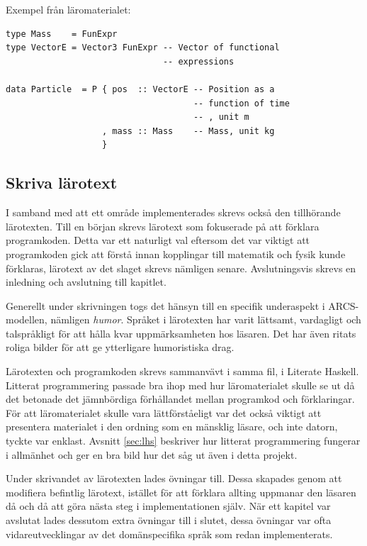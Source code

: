 Exempel från läromaterialet:
\begin{lstlisting}[frame=none, belowskip=-0.5\baselineskip, xleftmargin=0.5in]
type Mass    = FunExpr
type VectorE = Vector3 FunExpr -- Vector of functional
                               -- expressions

data Particle  = P { pos  :: VectorE -- Position as a
                                     -- function of time
                                     -- , unit m
                   , mass :: Mass    -- Mass, unit kg
                   }
\end{lstlisting}

\subsection{Skriva lärotext}

I samband med att ett område implementerades skrevs också den tillhörande
lärotexten. Till en början skrevs lärotext som fokuserade på att förklara
programkoden. Detta var ett naturligt val eftersom det var viktigt att
programkoden gick att förstå innan kopplingar till matematik och fysik kunde
förklaras, lärotext av det slaget skrevs nämligen senare. Avslutningsvis skrevs
en inledning och avslutning till kapitlet.

Generellt under skrivningen togs det hänsyn till en specifik underaspekt i
ARCS-modellen, nämligen \textit{humor}. Språket i lärotexten har varit lättsamt,
vardagligt och talspråkligt för att hålla kvar uppmärksamheten hos läsaren. Det
har även ritats roliga bilder för att ge ytterligare humoristiska drag.

Lärotexten och programkoden skrevs sammanvävt i samma fil, i Literate
Haskell. Litterat programmering passade bra ihop med
hur läromaterialet skulle se ut då det betonade det jämnbördiga förhållandet
mellan programkod och förklaringar. För att läromaterialet skulle vara
lättförståeligt var det också viktigt att presentera materialet i den ordning
som en mänsklig läsare, och inte datorn, tyckte var enklast. Avsnitt \ref{sec:lhs} beskriver hur litterat programmering fungerar i allmänhet och ger
en bra bild hur det såg ut även i detta projekt.

Under skrivandet av lärotexten lades övningar till. Dessa skapades genom att
modifiera befintlig lärotext, istället för att förklara allting uppmanar den
läsaren då och då att göra nästa steg i implementationen själv. När ett kapitel
var avslutat lades dessutom extra övningar till i slutet, dessa övningar var
ofta vidareutvecklingar av det domänspecifika språk som redan implementerats.

